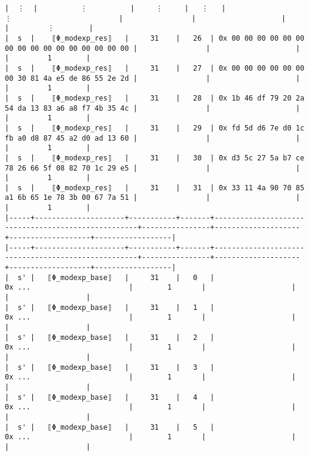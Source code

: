 \documentclass[varwidth=\maxdimen,margin=0.5cm,multi={verbatim}]{standalone}
\begin{document}
\begin{verbatim}
|  ⋮  |          ⋮          |     ⋮     |   ⋮   |                          ⋮                         |                |                    |                   |         ⋮        |
|  s  |    ⟦Φ_modexp_res⟧   |     31    |   26  | 0x 00 00 00 00 00 00 00 00 00 00 00 00 00 00 00 00 |                |                    |                   |         1        |
|  s  |    ⟦Φ_modexp_res⟧   |     31    |   27  | 0x 00 00 00 00 00 00 00 30 81 4a e5 de 86 55 2e 2d |                |                    |                   |         1        |
|  s  |    ⟦Φ_modexp_res⟧   |     31    |   28  | 0x 1b 46 df 79 20 2a 54 da 13 83 a6 a8 f7 4b 35 4c |                |                    |                   |         1        |
|  s  |    ⟦Φ_modexp_res⟧   |     31    |   29  | 0x fd 5d d6 7e d0 1c fb a0 d8 87 45 a2 d0 ad 13 60 |                |                    |                   |         1        |
|  s  |    ⟦Φ_modexp_res⟧   |     31    |   30  | 0x d3 5c 27 5a b7 ce 78 26 66 5f 08 82 70 1c 29 e5 |                |                    |                   |         1        |
|  s  |    ⟦Φ_modexp_res⟧   |     31    |   31  | 0x 33 11 4a 90 70 85 a1 6b 65 1e 78 3b 00 67 7a 51 |                |                    |                   |         1        |
|-----+---------------------+-----------+-------+----------------------------------------------------+----------------+--------------------+-------------------+------------------|
|-----+---------------------+-----------+-------+----------------------------------------------------+----------------+--------------------+-------------------+------------------|
|  s' |   ⟦Φ_modexp_base⟧   |     31    |   0   |                       0x ...                       |        1       |                    |                   |                  |
|  s' |   ⟦Φ_modexp_base⟧   |     31    |   1   |                       0x ...                       |        1       |                    |                   |                  |
|  s' |   ⟦Φ_modexp_base⟧   |     31    |   2   |                       0x ...                       |        1       |                    |                   |                  |
|  s' |   ⟦Φ_modexp_base⟧   |     31    |   3   |                       0x ...                       |        1       |                    |                   |                  |
|  s' |   ⟦Φ_modexp_base⟧   |     31    |   4   |                       0x ...                       |        1       |                    |                   |                  |
|  s' |   ⟦Φ_modexp_base⟧   |     31    |   5   |                       0x ...                       |        1       |                    |                   |                  |

\end{verbatim}
\end{document}
